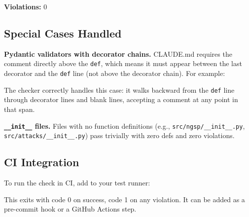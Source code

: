 \textbf{Violations:} 0

\subsection{Special Cases Handled}\label{special-cases-handled}

\textbf{Pydantic validators with decorator chains.} CLAUDE.md requires
the comment directly above the \texttt{def}, which means it must appear
between the last decorator and the \texttt{def} line (not above the
decorator chain). For example:

\begin{Shaded}
\begin{Highlighting}[]
\NormalTok{(}\NormalTok{)}
\NormalTok{) }\OperatorTok{{-}\textgreater{}} \NormalTok{:}
\end{Highlighting}
\end{Shaded}

The checker correctly handles this case: it walks backward from the
\texttt{def} line through decorator lines and blank lines, accepting a
comment at any point in that span.

\textbf{\texttt{\_\_init\_\_} files.} Files with no function definitions
(e.g., \texttt{src/ngsp/\_\_init\_\_.py},
\texttt{src/attacks/\_\_init\_\_.py}) pass trivially with zero defs and
zero violations.

\subsection{CI Integration}\label{ci-integration}

To run the check in CI, add to your test runner:

\begin{Shaded}
\begin{Highlighting}[]
\end{Highlighting}
\end{Shaded}

This exits with code 0 on success, code 1 on any violation. It can be
added as a pre-commit hook or a GitHub Actions step.
